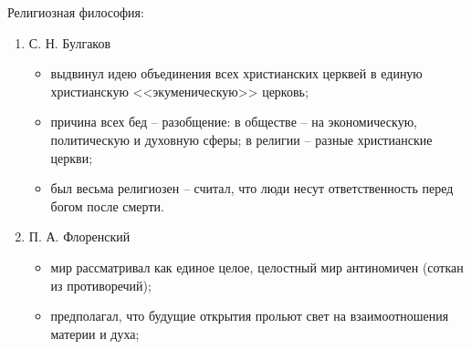 
Религиозная философия:
\begin{enumerate}
	\item С. Н. Булгаков 
	\begin{itemize}
		\item выдвинул идею объединения всех христианских церквей в единую христианскую <<экуменическую>> церковь;
		\item причина всех бед -- разобщение: в обществе -- на экономическую, политическую и духовную сферы; в религии -- разные христианские церкви;
		\item был весьма религиозен -- считал, что люди несут ответственность перед богом после смерти.
	\end{itemize}
	\item П. А. Флоренский
	\begin{itemize}
		\item мир рассматривал как единое целое, целостный мир антиномичен (соткан из противоречий);
		\item предполагал, что будущие открытия прольют свет на взаимоотношения материи и духа;
	\end{itemize}
\end{enumerate}

